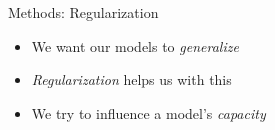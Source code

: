 %

\begin{slide}{Methods: Regularization}
  \begin{itemize}
    \item<1-> We want our models to \emph{generalize}
    \item<2-> \emph{Regularization} helps us with this
    \item<3-> We try to influence a model's \emph{capacity}
  \end{itemize}
\end{slide}

